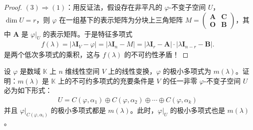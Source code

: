 \documentclass[../../main.tex]{subfiles}%
\begin{document}
\begin{proof}
$(3)\Rightarrow(1)$：用反证法，假设存在非平凡的 $\varphi$-不变子空间 $U$，$\dim U = r$，则 $\varphi$ 在一组基下的表示矩阵为分块上三角矩阵 $M = \begin{pmatrix}
\boldsymbol{A} & \boldsymbol{C} \\
\boldsymbol{O} & \boldsymbol{B}
\end{pmatrix}$，其中 $\boldsymbol{A}$ 是 $\varphi|_U$ 的表示矩阵。于是特征多项式
\begin{align*}
f(\lambda)=|\lambda\boldsymbol{I}_V - \varphi|=|\lambda\boldsymbol{I}_n - M|=|\lambda\boldsymbol{I}_r - \boldsymbol{A}|\cdot|\lambda\boldsymbol{I}_{n - r} - \boldsymbol{B}|.
\end{align*}
是两个低次多项式的乘积，这与 $f(\lambda)$ 的不可约性矛盾！
\end{proof}

\begin{proposition}\label{proposition:极小多项式是不可约多项式的刻画}
设 $\varphi$ 是数域 $\mathbb{K}$ 上 $n$ 维线性空间 $V$ 上的线性变换，$\varphi$ 的极小多项式为 $m(\lambda)$。证明：$m(\lambda)$ 是 $\mathbb{K}$ 上的不可约多项式的充要条件是 $V$ 的任一非零 $\varphi$-不变子空间 $U$ 必为如下形式：
\begin{align*}
U = C(\varphi,\alpha_1)\oplus C(\varphi,\alpha_2)\oplus\cdots\oplus C(\varphi,\alpha_k)
\end{align*}
并且 $\varphi|_{C(\varphi,\alpha_i)}$ 的极小多项式都是 $m(\lambda)$。此时，$\varphi|_U$ 的极小多项式也是 $m(\lambda)$。
\end{proposition}
\end{document}
